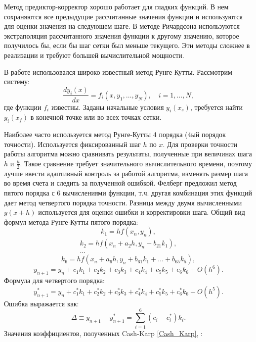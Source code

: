 Метод предиктор-корректор хорошо работает для гладких функций. В нем сохраняются все предыдущие рассчитанные значения функции и используются для оценки значения на следующем шаге. В методе Ричардсона используются экстраполяция рассчитанного значения функции к другому значению, которое получилось бы, если бы шаг сетки был меньше текущего. Эти методы сложнее в реализации и требуют большей вычислительной мощности.

В работе использовался широко известный метод Рунге-Кутты. Рассмотрим систему:
%
\begin{equation}
\frac{dy_i(x)}{dx}=f_i(x,y_1,\dots,y_N),\quad i=1,\dots,N,
\end{equation}
%
где функции $f_i$ известны. Заданы начальные условия $y_i(x_s)$, требуется найти $y_i(x_f)$ в конечной точке или во всех точках сетки.

Наиболее часто используется метод Рунге-Кутты 4 порядка (4ый порядок точности). Используется фиксированный шаг $h$ по $x$. Для проверки точности работы алгоритма можно сравнивать результаты, полученные при величинах шага $h$ и $\frac{h}{2}$. Такое сравнение требует значительного вычислительного времени, поэтому лучше ввести адаптивный контроль за работой алгоритма, изменять размер шага во время счета и следить за полученной ошибкой. Фелберг \cite{Press2002} предложил метод пятого порядка с 6 вычислениями функции, т.ч. другая комбинация этих функций дает метод четвертого порядка точности. Разница между двумя вычисленными $y(x+h)$ используется для оценки ошибки и корректировки шага. Общий вид формул метода Рунге-Кутты пятого порядка:
\begin{equation}
k_1=hf(x_n,y_n),
\end{equation}
\begin{equation}
\begin{split}
k_2=hf(x_n+a_2h,y_n+b_{21}k_1),\\
\dots
\end{split}
\end{equation}
\begin{equation}
k_6=hf(x_n+a_6h,y_n+b_{61}k_1+\dots+b_{65}k_5),
\end{equation}
\begin{equation}
y_{n+1}=y_n+c_1k_1+c_2k_2+c_3k_3+c_4k_4+c_5k_5+c_6k_6+O(h^6).
\end{equation}
Формула для четвертого порядка:
\begin{equation}
y_{n+1}^*=y_n+c_1^*k_1+c_2^*k_2+c_3^*k_3+c_4^*k_4+c_5^*k_5+c_6^*k_6+O(h^5).
\end{equation}
Ошибка выражается как:
\begin{equation}
\Delta\equiv y_{n+1}-y_{n+1}^*=\sum_{i=1}^6(c_i-c_i^*)k_i.
\end{equation}
Значения коэффициентов, полученных Cash-Karp \ref{Cash_Karp}, \cite{Press2002}:


